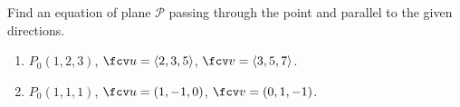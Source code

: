 Find an equation of plane $\mathcal P$ passing through the point and parallel to the given directions.

\begin{enumerate}
\item $P_0(1,2,3)$, $\fcv u=\langle2,3,5\rangle$, $\fcv v=\langle3,5,7 \rangle$.

\item $P_0(1,1,1)$, $\fcv u=(1,-1,0)$, $\fcv v= (0,1,-1)$.
\end{enumerate}